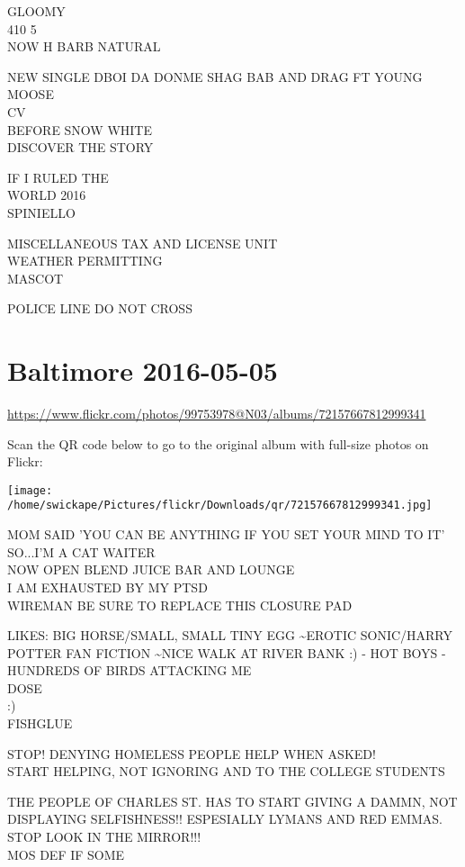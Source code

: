 \documentclass[10pt,letterpaper]{article}
\begin{document}
GLOOMY\\
410 5\\
NOW H BARB NATURAL

NEW SINGLE DBOI DA DONME SHAG BAB AND DRAG FT YOUNG MOOSE\\
CV\\
BEFORE SNOW WHITE\\
DISCOVER THE STORY

IF I RULED THE\\
WORLD 2016\\
SPINIELLO

MISCELLANEOUS TAX AND LICENSE UNIT\\
WEATHER PERMITTING\\
MASCOT

POLICE LINE DO NOT CROSS


\section*{Baltimore 2016-05-05}

\url{https://www.flickr.com/photos/99753978@N03/albums/72157667812999341}

Scan the QR code below to go to the original album with full-size photos on Flickr:

\texttt{[image: /home/swickape/Pictures/flickr/Downloads/qr/72157667812999341.jpg]}


MOM SAID 'YOU CAN BE ANYTHING IF YOU SET YOUR MIND TO IT' SO...I'M A CAT WAITER\\
NOW OPEN BLEND JUICE BAR AND LOUNGE\\
I AM EXHAUSTED BY MY PTSD\\
WIREMAN BE SURE TO REPLACE THIS CLOSURE PAD

LIKES: BIG HORSE/SMALL, SMALL TINY EGG \textasciitilde{}EROTIC SONIC/HARRY POTTER FAN FICTION \textasciitilde{}NICE WALK AT RIVER BANK :) {-} HOT BOYS {-} HUNDREDS OF BIRDS ATTACKING ME\\
DOSE\\
:)\\
FISHGLUE

STOP! DENYING HOMELESS PEOPLE HELP WHEN ASKED!\\
START HELPING, NOT IGNORING  AND TO THE COLLEGE STUDENTS

THE PEOPLE OF CHARLES ST. HAS TO START GIVING A DAMMN, NOT DISPLAYING SELFISHNESS!! ESPESIALLY LYMANS AND RED EMMAS.  STOP LOOK IN THE MIRROR!!!\\
MOS DEF IF SOME
\end{document}
